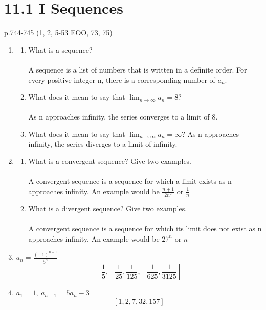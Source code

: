 \documentclass[12pt]{article}
\begin{document}
\newpage\section{11.1 I Sequences}
p.744-745 (1, 2, 5-53 EOO, 73, 75)
\begin{enumerate}
    \item
        \begin{enumerate}
            \item What is a sequence?\\\\
                A sequence is a list of numbers that is written in a definite order. For every positive integer n, there is a corresponding number of $a_n$.\\
            \item What does it mean to say that $\lim_{n\to\infty}a_n = 8$?
                \\\\ As n approaches infinity, the series converges to a limit of 8.\\
            \item What does it mean to say that $\lim_{n\to\infty}a_n = \infty$?
                 As n approaches infinity, the series diverges to a limit of infinity.\\
        \end{enumerate}
    \item
        \begin{enumerate}
            \item What is a convergent sequence? Give two examples. 
                \\\\ A convergent sequence is a sequence for which a limit exists as n approaches infinity. An example would be $\frac{n+1}{2n^2}$ or $\frac{1}{n}$ \\
            \item What is a divergent sequence? Give two examples.
                \\\\ A convergent sequence is a sequence for which its limit does not exist as n approaches infinity. An example would be $27^n$ or $n$ \\
        \end{enumerate}
    \addtocounter{enumi}{2}\item $a_n=\frac{(-1)^{n-1}}{5^n}$
        \begin{equation*}
            \left[\frac{1}{5}, -\frac{1}{25}, \frac{1}{125}, -\frac{1}{625}, \frac{1}{3125}\right]
        \end{equation*}
    \addtocounter{enumi}{3}\item $a_1=1,\ a_{n+1}=5a_n-3$
        \begin{equation*}
            \left[1,2,7,32,157 \right]
        \end{equation*}
        

\end{enumerate}
\end{document}
